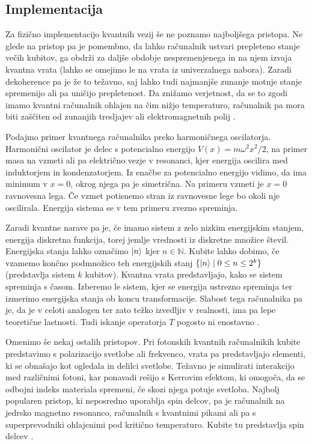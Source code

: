 \documentclass[mat1]{fmfdelo}
\newcommand{\N}{\mathbb N}
\begin{document}
\subsection{Implementacija}
Za fizično implementacijo kvantnih vezij še ne poznamo najboljšega pristopa. Ne glede na pristop pa je pomembno, da lahko računalnik ustvari prepleteno stanje večih kubitov, ga obdrži za daljše obdobje nespremenjenega in na njem izvaja kvantna vrata (lahko se omejimo le na vrata iz univerzalnega nabora). Zaradi dekoherence pa je že to težavno, saj lahko tudi najmanjše zunanje motnje stanje spremenijo ali pa uničijo prepletenost. Da znižamo verjetnost, da se to zgodi imamo kvantni računalnik ohlajen na čim nižjo temperaturo, računalnik pa mora biti zaščiten od zunanjih tresljajev ali elektromagnetnih polij \cite[Poglavje 7.2]{nielsen}. 

Podajmo primer kvantnega računalnika preko harmoničnega oscilatorja. Harmonični oscilator je delec s potencialno energijo \(V(x)=m\omega^2x^2/2\), na primer masa na vzmeti ali pa električno vezje v resonanci, kjer energija oscilira med induktorjem in kondenzatorjem. Iz enačbe za potencialno energijo vidimo, da ima minimum v \(x=0\), okrog njega pa je simetrična. Na primeru vzmeti je \(x=0\) ravnovesna lega. Če vzmet potisnemo stran iz ravnovesne lege bo okoli nje oscilirala. Energija sistema se v tem primeru zvezno spreminja.

Zaradi kvantne narave pa je, če imamo sistem z zelo nizkim energijskim stanjem, energija diskretna funkcija, torej jemlje vrednosti iz diskretne množice števil. Energijska stanja lahko označimo \(\ket{n}\) kjer \(n\in \N\). Kubite lahko dobimo, če vzamemo končno podmnožico teh energijskih stanj \(\{\ket{ n } \mid 0\leq n \leq 2^k\}\) (predstavlja sistem \(k\) kubitov). Kvantna vrata predstavljajo, kako se sistem spreminja s časom. Izberemo le sistem, kjer se energija ustrezno spreminja ter izmerimo energijska stanja ob koncu transformacije. Slabost tega računalnika pa je, da je v celoti analogen ter zato težko izvedljiv v realnosti, ima pa lepe teoretične lastnosti. Tudi iskanje operatorja \(T\) pogosto ni enostavno \cite[Poglavje 7.3]{nielsen}.

Omenimo še nekaj ostalih pristopov. Pri fotonskih kvantnih računalnikih kubite predstavimo s polarizacijo svetlobe ali frekvenco, vrata pa predstavljajo elementi, ki se obnašajo kot ogledala in delilci svetlobe. Težavno je simulirati interakcijo med različnimi fotoni, kar ponavadi rešijo s Kerrovim efektom, ki omogoča, da se odbojni indeks materiala spremeni, če skozi njega potuje svetloba. Najbolj popularen pristop, ki neposredno uporablja spin delcov, pa je računalnik na jedrsko magnetno resonanco, računalnik s kvantnimi pikami ali pa s superprevodniki ohlajenimi pod kritično temperaturo. Kubite tu predstavlja spin delcev \cite{adamowski}.
\end{document}
